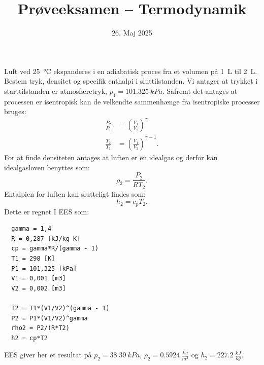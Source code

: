 \documentclass[a4paper]{article}
\title{Prøveeksamen – Termodynamik}
\date{26. Maj 2025}
\begin{document}
\maketitle

Luft ved \qty{25}{\celsius} ekspanderes i en adiabatisk proces fra et volumen på \qty{1}{L} til \qty{2}{L}. Bestem tryk, densitet og specifik enthalpi i sluttilstanden.
\bigbreak
Vi antager at trykket i starttilstanden er atmosfæretryk, $p_1 = \qty{101,325}{kPa}$. Såfremt det antages at processen er isentropisk kan de velkendte sammenhænge fra isentropiske processer bruges:
\begin{align*}
  \frac{P_2}{P_1} &= \left( \frac{V_1}{V_2} \right)^{\gamma} \\
  \frac{T_2}{T_1} &= \left( \frac{V_1}{V_2} \right)^{\gamma - 1}
.\end{align*}
For at finde densiteten antages at luften er en idealgas og derfor kan idealgasloven benyttes som:
\[ 
\rho_2 = \frac{P_2}{R T_2}
.\]
Entalpien for luften kan slutteligt findes som:
\[ 
h_2 = c_p T_2
.\]
Dette er regnet I EES som:
\begin{verbatim}
  gamma = 1,4
  R = 0,287 [kJ/kg K]
  cp = gamma*R/(gamma - 1)
  T1 = 298 [K]
  P1 = 101,325 [kPa]
  V1 = 0,001 [m3]
  V2 = 0,002 [m3]
   
  T2 = T1*(V1/V2)^(gamma - 1)
  P2 = P1*(V1/V2)^gamma
  rho2 = P2/(R*T2)
  h2 = cp*T2
\end{verbatim}
EES giver her et resultat på $p_2 = \qty{38,39}{kPa}$, $\rho_2 = \qty{0,5924}{\frac{kg}{m^3}} $ og $h_2 = \qty{227,2}{\frac{kJ}{kg}}$. 
\end{document}
